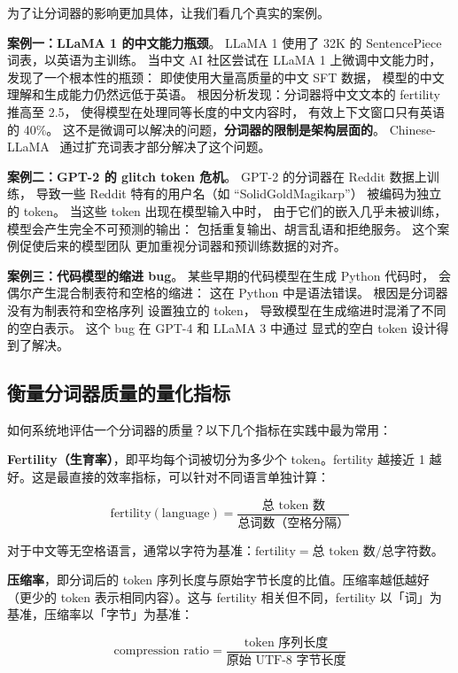 为了让分词器的影响更加具体，让我们看几个真实的案例。

\textbf{案例一：LLaMA 1 的中文能力瓶颈}。
LLaMA 1 使用了 32K 的 SentencePiece 词表，以英语为主训练。
当中文 AI 社区尝试在 LLaMA 1 上微调中文能力时，
发现了一个根本性的瓶颈：
即使使用大量高质量的中文 SFT 数据，
模型的中文理解和生成能力仍然远低于英语。
根因分析发现：分词器将中文文本的 fertility 推高至 2.5，
使得模型在处理同等长度的中文内容时，
有效上下文窗口只有英语的 40\%。
这不是微调可以解决的问题，\textbf{分词器的限制是架构层面的}。
Chinese-LLaMA~\cite{cui2024llama} 通过扩充词表才部分解决了这个问题。

\textbf{案例二：GPT-2 的 glitch token 危机}。
GPT-2 的分词器在 Reddit 数据上训练，
导致一些 Reddit 特有的用户名（如 “SolidGoldMagikarp”）
被编码为独立的 token。
当这些 token 出现在模型输入中时，
由于它们的嵌入几乎未被训练，
模型会产生完全不可预测的输出：
包括重复输出、胡言乱语和拒绝服务。
这个案例促使后来的模型团队
更加重视分词器和预训练数据的对齐。

\textbf{案例三：代码模型的缩进 bug}。
某些早期的代码模型在生成 Python 代码时，
会偶尔产生混合制表符和空格的缩进：
这在 Python 中是语法错误。
根因是分词器没有为制表符和空格序列
设置独立的 token，
导致模型在生成缩进时混淆了不同的空白表示。
这个 bug 在 GPT-4 和 LLaMA 3 中通过
显式的空白 token 设计得到了解决。

\subsection{衡量分词器质量的量化指标}

如何系统地评估一个分词器的质量？以下几个指标在实践中最为常用：

\textbf{Fertility（生育率）}，即平均每个词被切分为多少个 token。fertility 越接近 1 越好。这是最直接的效率指标，可以针对不同语言单独计算：

\begin{equation}
  \text{fertility}(\text{language}) = \frac{\text{总 token 数}}{\text{总词数（空格分隔）}}
\end{equation}

对于中文等无空格语言，通常以字符为基准：$\text{fertility} = \text{总 token 数} / \text{总字符数}$。

\textbf{压缩率}，即分词后的 token 序列长度与原始字节长度的比值。压缩率越低越好（更少的 token 表示相同内容）。这与 fertility 相关但不同，fertility 以「词」为基准，压缩率以「字节」为基准：

\begin{equation}
  \text{compression ratio} = \frac{\text{token 序列长度}}{\text{原始 UTF-8 字节长度}}
\end{equation}

